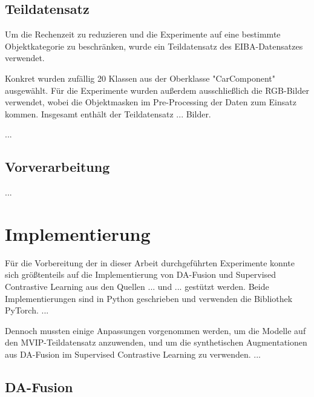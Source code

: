 \subsection{Teildatensatz} \label{sec:subdataset}

Um die Rechenzeit zu reduzieren und die Experimente auf eine bestimmte Objektkategorie zu beschränken, wurde ein Teildatensatz des EIBA-Datensatzes verwendet.

Konkret wurden zufällig 20 Klassen aus der Oberklasse "CarComponent" ausgewählt. Für die Experimente wurden außerdem ausschließlich die RGB-Bilder verwendet, wobei die Objektmasken im Pre-Processing der Daten zum Einsatz kommen. Insgesamt enthält der Teildatensatz ... Bilder.

...

\subsection{Vorverarbeitung} \label{sec:preprocessing}

...

\section{Implementierung} \label{sec:implementation}


Für die Vorbereitung der in dieser Arbeit durchgeführten Experimente konnte sich größtenteils auf die Implementierung von DA-Fusion und Supervised Contrastive Learning aus den Quellen ... und ... gestützt werden. Beide Implementierungen sind in Python geschrieben und verwenden die Bibliothek PyTorch. ...

Dennoch mussten einige Anpassungen vorgenommen werden, um die Modelle auf den MVIP-Teildatensatz anzuwenden, und um die synthetischen Augmentationen aus DA-Fusion im Supervised Contrastive Learning zu verwenden. ...

\subsection{DA-Fusion} \label{sec:impl-da-fusion}

